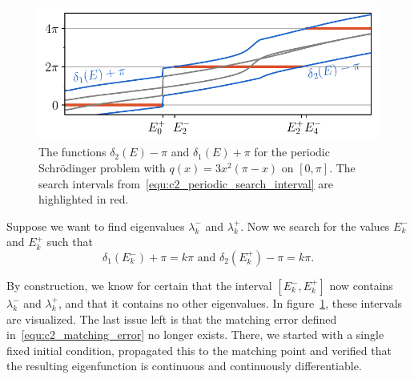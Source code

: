 \begin{figure}
    \begin{center}
        \includegraphics[width=\textwidth]{img/chapter2/prufer/periodic_find_ep_em.pdf}
    \end{center}
    \caption{The functions $\delta_2(E) - \pi$ and $\delta_1(E) + \pi$ for the periodic Schrödinger problem with $q(x) = 3x^2(\pi - x)$ on $[0, \pi]$. The search intervals from~\eqref{equ:c2_periodic_search_interval} are highlighted in red.}\label{fig:c2_periodic_find_ep_em}
\end{figure}

Suppose we want to find eigenvalues $\lambda_k^{-}$ and $\lambda_k^{+}$. Now we search for the values $E_k^{-}$ and $E_k^{+}$ such that
\begin{equation}\label{equ:c2_periodic_search_interval}
    \delta_1(E_k^{-}) + \pi = k \pi \text{ and } \delta_2(E_k^{+}) - \pi = k \pi\text{.}
\end{equation}

By construction, we know for certain that the interval $[E_k^{-}, E_k^{+}]$ now contains $\lambda_k^{-}$ and $\lambda_k^{+}$, and that it contains no other eigenvalues. In figure~\ref{fig:c2_periodic_find_ep_em}, these intervals are visualized. The last issue left is that the matching error defined in~\eqref{equ:c2_matching_error} no longer exists. There, we started with a single fixed initial condition, propagated this to the matching point and verified that the resulting eigenfunction is continuous and continuously differentiable.

